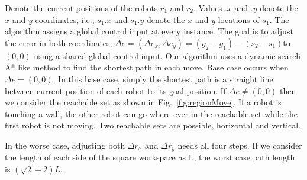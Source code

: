 Denote the current positions of the robots  $r_1$ and $r_2$. 
Values $.x$ and $.y$ denote the $x$ and $y$ coordinates, i.e., $s_1.x$ and $s_1.y$ denote the $x$ and $y$ locations of $s_1$. 
The algorithm assigns a global control input at every instance.
The goal is to adjust the error in both coordinates,
 $\Delta e =(\Delta e_x, \Delta e_y) =(g_2-g_1)- (s_2-s_1)$to $(0,0)$ using a shared global control input. 
Our algorithm uses a dynamic search A* like method to find the shortest path in each move. Base case occurs when $\Delta e= (0,0)$. In this base case, simply the shortest path is a straight line between current position of each robot to its goal position. 
If  $\Delta e\neq (0,0)$ then we consider the reachable set as shown in Fig.~\ref{fig:regionMove}. If a robot is touching a wall, the other robot can go where ever in the reachable set while the first robot is not moving. Two reachable sets are possible, horizontal and vertical. 
%
%
%
%

In the worse case, adjusting both $\Delta r_x$ and $\Delta r_y$ needs all four steps. If we consider the length of each side of the square workspace as L, the worst case path length is $(\sqrt{2}+2)L$.





